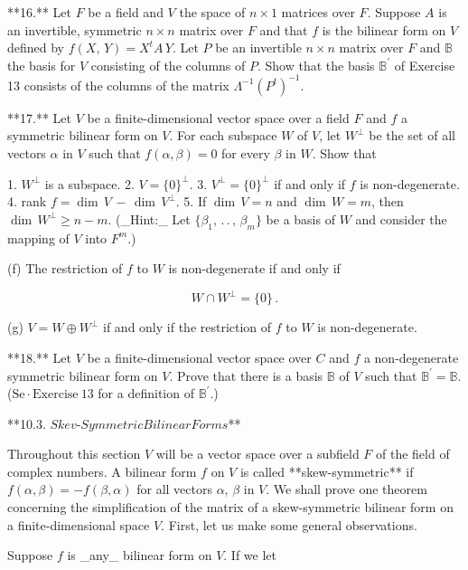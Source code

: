 

**16.** Let \(F\) be a field and \(V\) the space of \(n\times 1\) matrices over \(F\). Suppose \(A\) is an invertible, symmetric \(n\times n\) matrix over \(F\) and that \(f\) is the bilinear form on \(V\) defined by \(f(X,\,Y)=X^{t}A\,Y\). Let \(P\) be an invertible \(n\times n\) matrix over \(F\) and \(\mathbb{B}\) the basis for \(V\) consisting of the columns of \(P\). Show that the basis \(\mathbb{B}^{\prime}\) of Exercise 13 consists of the columns of the matrix \(\Lambda^{-1}(P^{t})^{-1}\).

**17.** Let \(V\) be a finite-dimensional vector space over a field \(F\) and \(f\) a symmetric bilinear form on \(V\). For each subspace \(W\) of \(V\), let \(W^{\perp}\) be the set of all vectors \(\alpha\) in \(V\) such that \(f(\alpha,\beta)=0\) for every \(\beta\) in \(W\). Show that

1. \(W^{\perp}\) is a subspace.
2. \(V=\{0\}^{\perp}\).
3. \(V^{\perp}=\{0\}^{\perp}\) if and only if \(f\) is non-degenerate.
4. rank \(f=\dim\,V\,-\,\dim\,V^{\perp}\).
5. If \(\dim\,V=n\) and \(\dim\,W=m\), then \(\dim\,W^{\perp}\geq n-m\). (_Hint:_ Let \(\{\beta_{1},\,.\,.\,,\,\beta_{m}\}\) be a basis of \(W\) and consider the mapping of \(V\) into \(F^{m}\).)

(f) The restriction of \(f\) to \(W\) is non-degenerate if and only if

\[W\cap W^{\perp}=\{0\}\,.\]

(g) \(V=W\oplus W^{\perp}\) if and only if the restriction of \(f\) to \(W\) is non-degenerate.

**18.** Let \(V\) be a finite-dimensional vector space over \(C\) and \(f\) a non-degenerate symmetric bilinear form on \(V\). Prove that there is a basis \(\mathbb{B}\) of \(V\) such that \(\mathbb{B}^{\prime}=\mathbb{B}\). (\(\mathrm{Se}\cdot\mathrm{Exercise\ 13}\) for a definition of \(\mathbb{B}^{\prime}\).)

**10.3. \(Skev\)-\(Symmetric\)\(Bilinear\)\(Forms\)**

Throughout this section \(V\) will be a vector space over a subfield \(F\) of the field of complex numbers. A bilinear form \(f\) on \(V\) is called **skew-symmetric** if \(f(\alpha,\beta)=-f(\beta,\alpha)\) for all vectors \(\alpha\), \(\beta\) in \(V\). We shall prove one theorem concerning the simplification of the matrix of a skew-symmetric bilinear form on a finite-dimensional space \(V\). First, let us make some general observations.

Suppose \(f\) is _any_ bilinear form on \(V\). If we let

